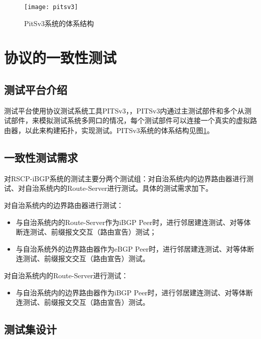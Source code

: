 \begin{figure}
  \centering
  \texttt{[image: pitsv3]}
  \caption{PitSv3系统的体系结构\cite{pitsv3}}
  \label{fig:pitsv3}
\end{figure}


\section{协议的一致性测试}
\subsection{测试平台介绍}
测试平台使用协议测试系统工具PITSv3，，PITSv3内通过主测试部件和多个从测试部件，来模拟测试系统多网口的情况，每个测试部件可以连接一个真实的虚拟路由器，以此来构建拓扑，实现测试。PITSv3系统的体系结构见图\ref{fig:pitsv3}。
\subsection{一致性测试需求}

对RSCP-iBGP系统的测试主要分两个测试组：对自治系统内的边界路由器进行测试、对自治系统内的Route-Server进行测试。具体的测试需求加下。

对自治系统内的边界路由器进行测试：
\begin{itemize}
  \item 与自治系统内的Route-Server作为iBGP Peer时，进行邻居建连测试、对等体断连测试、前缀报文交互（路由宣告）测试；
  \item 与自治系统外的边界路由器作为eBGP Peer时，进行邻居建连测试、对等体断连测试、前缀报文交互（路由宣告）测试。
\end{itemize}

对自治系统内的Route-Server进行测试：
\begin{itemize}
  \item 与自治系统内的边界路由器作为iBGP Peer时，进行邻居建连测试、对等体断连测试、前缀报文交互（路由宣告）测试。
\end{itemize}




\subsection{测试集设计}


